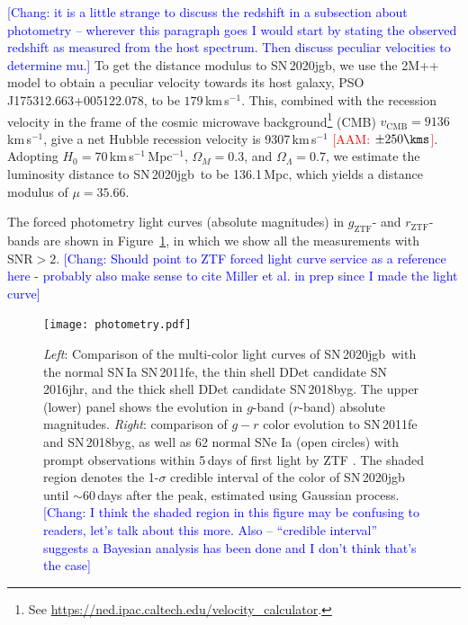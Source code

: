 \documentclass[twocolumn]{aastex631}
\newcommand{\sn}{SN\,2020jgb}
\newcommand{\adam}[1]{\textcolor{red}{[AAM: #1]}}
\newcommand{\chang}[1]{\textcolor{blue}{[Chang: #1]}}
\begin{document}
\chang{it is a little strange to discuss the redshift in a subsection about photometry -- wherever this paragraph goes I would start by stating the observed redshift as measured from the host spectrum. Then discuss peculiar velocities to determine mu.}
To get the distance modulus to \sn, we use the 2M++ model \citep{Carrick2015_2M++} to obtain a peculiar velocity towards its host galaxy, PSO\,J175312.663+005122.078, to be $179$\,km\,s$^{-1}$. This, combined with the recession velocity in the frame of the cosmic microwave background\footnote{See \url{https://ned.ipac.caltech.edu/velocity_calculator}.} (CMB) $v_\mathrm{CMB}=9136$\,km\,s$^{-1}$, give a net Hubble recession velocity is 9307\,km\,s$^{-1}$ \adam{$\pm 250 \kms$}. Adopting $H_0=70$\,km\,s$^{-1}$\,Mpc$^{-1}$, $\Omega_M=0.3$, and $\Omega_\Lambda=0.7$, we estimate the luminosity distance to \sn\ to be 136.1\,Mpc, which yields a distance modulus of $\mu=35.66$.

The forced photometry light curves (absolute magnitudes) in $g_\mathrm{ZTF}$- and $r_\mathrm{ZTF}$-bands are shown in Figure~\ref{fig:photometry}, in which we show all the measurements with $\mathrm{SNR}>2$. \chang{Should point to ZTF forced light curve service as a reference here - probably also make sense to cite Miller et al. in prep since I made the light curve}

\begin{figure}
    \centering
    \texttt{[image: photometry.pdf]}
    \caption{\textit{Left}: Comparison of the multi-color light curves  of \sn\ with the normal SN\,Ia SN\,2011fe, the thin shell DDet candidate SN\,2016jhr, and the thick shell DDet candidate SN\,2018byg. The upper (lower) panel shows the evolution in $g$-band ($r$-band) absolute magnitudes. \textit{Right}: comparison of $g-r$ color evolution to SN\,2011fe and SN\,2018byg, as well as 62 normal SNe Ia (open circles) with prompt observations within 5\,days of first light by ZTF \citep{Bulla2020}. The shaded region denotes the 1-$\sigma$ credible interval of the color of SN\,2020jgb until $\sim$60\,days after the peak, estimated using Gaussian process. \chang{I think the shaded region in this figure may be confusing to readers, let's talk about this more. Also – ``credible interval'' suggests a Bayesian analysis has been done and I don't think that's the case}}
    \label{fig:photometry}
\end{figure}
\end{document}
